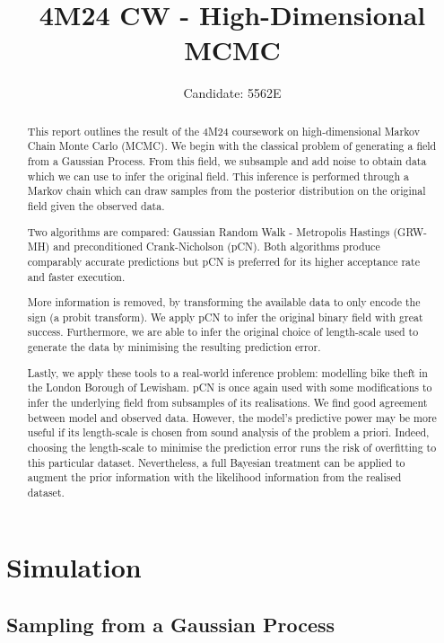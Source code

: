 \documentclass[]{article}
\title{4M24 CW - High-Dimensional MCMC}
\author{Candidate: 5562E}
\begin{document}


\setcounter{page}{1}
\maketitle

\begin{abstract}
	This report outlines the result of the 4M24 coursework on high-dimensional Markov Chain Monte Carlo (MCMC). We begin with the classical problem of generating a field from a Gaussian Process. From this field, we subsample and add noise to obtain data which we can use to infer the original field. This inference is performed through a Markov chain which can draw samples from the posterior distribution on the original field given the observed data.
	
	Two algorithms are compared: Gaussian Random Walk - Metropolis Hastings (GRW-MH) and preconditioned Crank-Nicholson (pCN). Both algorithms produce comparably accurate predictions but pCN is preferred for its higher acceptance rate and faster execution.
	
	More information is removed, by transforming the available data to only encode the sign (a probit transform). We apply pCN to infer the original binary field with great success. Furthermore, we are able to infer the original choice of length-scale used to generate the data by minimising the resulting prediction error.
	
	Lastly, we apply these tools to a real-world inference problem: modelling bike theft in the London Borough of Lewisham. pCN is once again used with some modifications to infer the underlying field from subsamples of its realisations. We find good agreement between model and observed data. However, the model's predictive power may be more useful if its length-scale is chosen from sound analysis of the problem a priori. Indeed, choosing the length-scale to minimise the prediction error runs the risk of overfitting to this particular dataset. Nevertheless, a full Bayesian treatment can be applied to augment the prior information with the likelihood information from the realised dataset. 
\end{abstract}

\tableofcontents

\section{Simulation}
\subsection{Sampling from a Gaussian Process}
\end{document}
